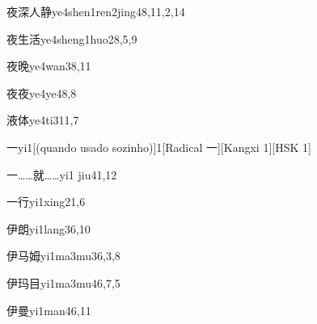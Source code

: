 \begin{entry}{夜深人静}{ye4shen1ren2jing4}{8,11,2,14}
\end{entry}

\begin{entry}{夜生活}{ye4sheng1huo2}{8,5,9}
\end{entry}

\begin{entry}{夜晚}{ye4wan3}{8,11}
\end{entry}

\begin{entry}{夜夜}{ye4ye4}{8,8}
\end{entry}

\begin{entry}{液体}{ye4ti3}{11,7}
\end{entry}

\begin{entry}{一}{yi1}[(quando usado sozinho)]{1}[Radical 一][Kangxi 1][HSK 1]
\end{entry}

\begin{entry}{一……就……}{yi1 jiu4}{1,12}
\end{entry}

\begin{entry}{一行}{yi1xing2}{1,6}
\end{entry}

\begin{entry}{伊朗}{yi1lang3}{6,10}
\end{entry}

\begin{entry}{伊马姆}{yi1ma3mu3}{6,3,8}
\end{entry}

\begin{entry}{伊玛目}{yi1ma3mu4}{6,7,5}
\end{entry}

\begin{entry}{伊曼}{yi1man4}{6,11}
\end{entry}

